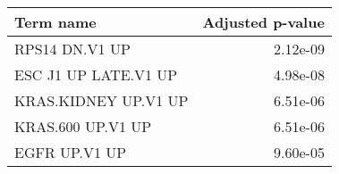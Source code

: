 \begin{tabular}{lr}
\toprule
            Term name &  Adjusted p-value \\
\midrule
       RPS14 DN.V1 UP &          2.12e-09 \\
 ESC J1 UP LATE.V1 UP &          4.98e-08 \\
 KRAS.KIDNEY UP.V1 UP &          6.51e-06 \\
    KRAS.600 UP.V1 UP &          6.51e-06 \\
        EGFR UP.V1 UP &          9.60e-05 \\
\bottomrule
\end{tabular}
